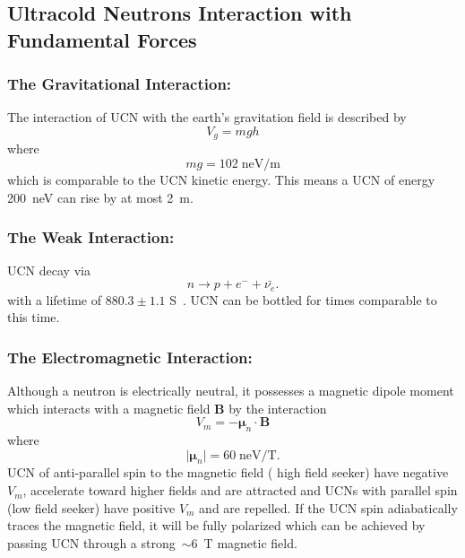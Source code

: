 \subsection{Ultracold Neutrons Interaction with Fundamental Forces}

\subsubsection{The Gravitational Interaction:}
The interaction of UCN with the earth's gravitation field is described by
\begin{equation}
V_g=mgh
\end{equation}
where
\begin{equation}
mg=102\; \text{neV/m}
\end{equation}
which is comparable to the UCN kinetic energy. This means a UCN of
energy 200~neV can rise by at most 2~m.

 \subsubsection{The Weak Interaction:}
UCN decay via
\label{neutrondecay}
\begin{equation}
n\longrightarrow p+e^{-}+\bar{\nu_{e}}.
\end{equation}
with a lifetime of $880.3\pm 1.1$ S~\cite{PDG}. UCN can be bottled for
times comparable to this time.

\subsubsection{The Electromagnetic Interaction:} Although a neutron is
electrically neutral, it possesses a magnetic dipole moment which
interacts with a magnetic field \textbf{B} by the interaction
\begin{equation}
V_m=-\boldsymbol{\mu}_n \cdot \textbf{B}
\end{equation}
where
\begin{equation}
\vert \boldsymbol{\mu}_n \vert =60 \; \text{neV/T}.
\end{equation}
\indent UCN of anti-parallel spin to the magnetic field ( high field
seeker) have negative $V_m$, accelerate toward higher fields and are
attracted and UCNs with parallel spin (low field seeker) have positive
$V_m$ and are repelled. If the UCN spin adiabatically traces the
magnetic field, it will be fully polarized which can be achieved by
passing UCN through a strong~$\sim 6$~T magnetic field.

